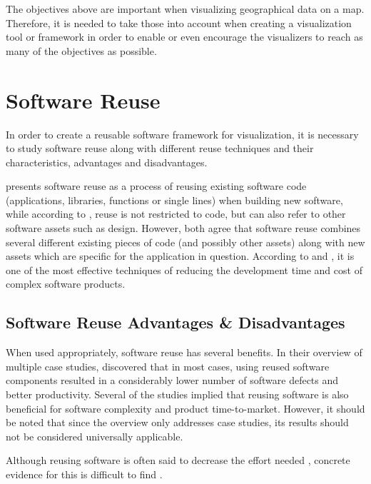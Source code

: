 The objectives above are important when visualizing geographical data on a map. Therefore, it is needed to take those into account when creating a visualization tool or framework in order to enable or even encourage the visualizers to reach as many of the objectives as possible.


\chapter{Software Reuse}
\label{chapter:reuse}

In order to create a reusable software framework for visualization, it is necessary to study software reuse along with different reuse techniques and their characteristics, advantages and disadvantages.

\citet{krueger_software_1992} presents software reuse as a process of reusing existing software code (applications, libraries, functions or single lines) when building new software, while according to \citet{mohagheghi_empirical_2008}, reuse is not restricted to code, but can also refer to other software assets such as design. However, both agree that software reuse combines several different existing pieces of code (and possibly other assets) along with new assets which are specific for the application in question. According to \citet{mcilroy_mass-produced_1969} and \citet{boehm_managing_1999}, it is one of the most effective techniques of reducing the development time and cost of complex software products.

\section{Software Reuse Advantages \& Disadvantages}

When used appropriately, software reuse has several benefits. In their overview of multiple case studies, \citet{mohagheghi_empirical_2008} discovered that in most cases, using reused software components resulted in a considerably lower number of software defects and better productivity. Several of the studies implied that reusing software is also beneficial for software complexity and product time-to-market. However, it should be noted that since the overview only addresses case studies, its results should not be considered universally applicable.

Although reusing software is often said to decrease the effort needed \citep{mcilroy_mass-produced_1969, boehm_managing_1999, mohagheghi_empirical_2008} , concrete evidence for this is difficult to find \citep{mohagheghi_empirical_2008}.

